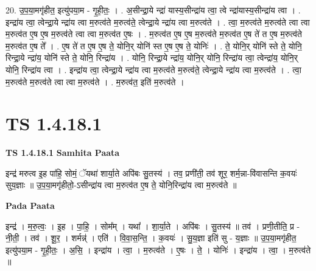 \documentclass[17pt]{extarticle}
\begin{document}
20. उ॒प॒या॒मगृ॑हीत॒ इत्यु॑पया॒म - गृ॒ही॒तः॒ । . अ॒सीन्द्रा॒ये न्द्रा॑ यास्य॒सीन्द्रा॑य त्वा॒ त्वे न्द्रा॑यास्य॒सीन्द्रा॑य त्वा । . इन्द्रा॑य त्वा॒ त्वेन्द्रा॒ये न्द्रा॑य त्वा म॒रुत्व॑ते म॒रुत्व॑ते॒ त्वेन्द्रा॒ये न्द्रा॑य त्वा म॒रुत्व॑ते । . त्वा॒ म॒रुत्व॑ते म॒रुत्व॑ते त्वा त्वा म॒रुत्व॑त ए॒ष ए॒ष म॒रुत्व॑ते त्वा त्वा म॒रुत्व॑त ए॒षः । . म॒रुत्व॑त ए॒ष ए॒ष म॒रुत्व॑ते म॒रुत्व॑त ए॒ष ते॑ त ए॒ष म॒रुत्व॑ते म॒रुत्व॑त ए॒ष ते᳚ । . ए॒ष ते॑ त ए॒ष ए॒ष ते॒ योनि॒र् योनि॑ स्त ए॒ष ए॒ष ते॒ योनिः॑ । . ते॒ योनि॒र् योनि॑ स्ते ते॒ योनि॒ रिन्द्रा॒ये न्द्रा॑य॒ योनि॑ स्ते ते॒ योनि॒ रिन्द्रा॑य । . योनि॒ रिन्द्रा॒ये न्द्रा॑य॒ योनि॒र् योनि॒ रिन्द्रा॑य त्वा॒ त्वेन्द्रा॑य॒ योनि॒र् योनि॒ रिन्द्रा॑य त्वा । . इन्द्रा॑य त्वा॒ त्वेन्द्रा॒ये न्द्रा॑य त्वा म॒रुत्व॑ते म॒रुत्व॑ते॒ त्वेन्द्रा॒ये न्द्रा॑य त्वा म॒रुत्व॑ते । . त्वा॒ म॒रुत्व॑ते म॒रुत्व॑ते त्वा त्वा म॒रुत्व॑ते । . म॒रुत्व॑त॒ इति॑ म॒रुत्व॑ते । \newline
\pagebreak
{}
\section*{ TS 1.4.18.1 }

\textbf{TS 1.4.18.1 } \newline
\textbf{Samhita Paata} \newline

इन्द्र॑ मरुत्व इ॒ह पा॑हि॒ सोमं॒ ॅयथा॑ शार्या॒ते अपि॑बः सु॒तस्य॑ । तव॒ प्रणी॑ती॒ तव॑ शूर॒ शर्म॒न्ना-वि॑वासन्ति क॒वयः॑ सुय॒ज्ञाः ॥ उ॒प॒या॒मगृ॑हीतो॒-ऽसीन्द्रा॑य त्वा म॒रुत्व॑त ए॒ष ते॒ योनि॒रिन्द्रा॑य त्वा म॒रुत्व॑ते ॥ \newline

\textbf{Pada Paata} \newline

इन्द्र॑ । म॒रु॒त्वः॒ । इ॒ह । पा॒हि॒ । सोम᳚म् । यथा᳚ । शा॒र्या॒ते । अपि॑बः । सु॒तस्य॑ ॥ तव॑ । प्रणी॒तीति॒ प्र - नी॒ती॒ । तव॑ । शू॒र॒ । शर्मन्न्॑ । एति॑ । वि॒वा॒स॒न्ति॒ । क॒वयः॑ । सु॒य॒ज्ञा इति॑ सु - य॒ज्ञाः ॥ उ॒प॒या॒मगृ॑हीत॒ इत्यु॑पया॒म - गृ॒ही॒तः॒ । अ॒सि॒ । इन्द्रा॑य । त्वा॒ । म॒रुत्व॑ते । ए॒षः । ते॒ । योनिः॑ । इन्द्रा॑य । त्वा॒ । म॒रुत्व॑ते ॥  \newline
\end{document}

